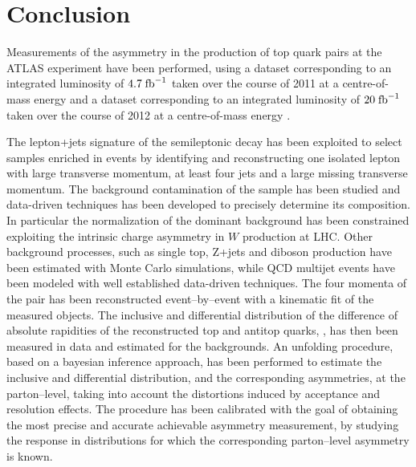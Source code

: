 \chapter{Conclusion}
\label{sec:conclusion}

Measurements of the asymmetry in the production of top quark pairs at
the ATLAS experiment have been performed, using a dataset
corresponding to an integrated luminosity of $4.7 \; \mathrm{fb}^{-1}{}$ taken over
the course of 2011 at a centre-of-mass energy \seventev{} and a
dataset corresponding to an integrated luminosity of $20 \; \mathrm{fb}^{-1}{}$
taken over the course of 2012 at a centre-of-mass energy \eighttev{}.

The lepton+jets signature of the semileptonic \ttbar{} decay has been
exploited to select samples enriched in \ttbar{} events by identifying
and reconstructing one isolated lepton with large transverse momentum,
at least four jets and a large missing transverse momentum.
The background contamination of the sample has been studied and
data-driven techniques has been developed to precisely determine its
composition. In particular the normalization of the dominant \wjets{}
background has been constrained exploiting the intrinsic charge
asymmetry in $W$ production at LHC. Other background processes, such
as single top, Z+jets and diboson production have been estimated with
Monte Carlo simulations, while QCD multijet events have been modeled
with well established data-driven techniques.
The four momenta of the \ttbar{} pair has been reconstructed
event--by--event with a kinematic fit of the measured objects. The
inclusive and differential distribution of the difference of absolute
rapidities of the reconstructed top and antitop quarks, \dy{}, has then been
measured in data and estimated for the backgrounds.
An unfolding procedure, based on a bayesian inference approach, has
been performed to estimate the inclusive and differential \dy{}
distribution, and the corresponding asymmetries, at the parton--level,
taking into account the distortions induced by acceptance and
resolution effects.
The procedure has been calibrated with the goal of obtaining the most
precise and accurate achievable asymmetry measurement, by studying the
response in distributions for which the corresponding parton--level
asymmetry is known.

